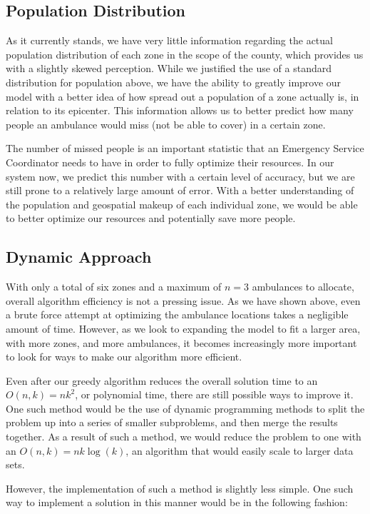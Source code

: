 \documentclass[notitlepage, 12pt]{article}
\begin{document}
\subsection{Population Distribution}
As it currently stands, we have very little information regarding the actual population distribution of each
zone in the scope of the county, which provides us with a slightly skewed perception. While we justified the
use of a standard distribution for population above, we have the ability to greatly improve our model with a
better idea of how spread out a population of a zone actually is, in relation to its epicenter. This information
allows us to better predict how many people an ambulance would miss (not be able to cover) in a certain zone.

The number of missed people is an important statistic that an Emergency Service Coordinator needs to have in
order to fully optimize their resources. In our system now, we predict this number with a certain level of accuracy,
but we are still prone to a relatively large amount of error. With a better understanding of the population and
geospatial makeup of each individual zone, we would be able to better optimize our resources and potentially save more people.

\subsection{Dynamic Approach}
With only a total of six zones and a maximum of $n = 3$ ambulances to allocate, overall algorithm efficiency is
not a pressing issue. As we have shown above, even a brute force attempt at optimizing the ambulance locations
takes a negligible amount of time. However, as we look to expanding the model to fit a larger area, with more
zones, and more ambulances, it becomes increasingly more important to look for ways to make our algorithm more efficient.

Even after our greedy algorithm reduces the overall solution time to an $O(n, k) = nk^2$, or polynomial time, there
are still possible ways to improve it. One such method would be the use of dynamic programming methods to split the
problem up into a series of smaller subproblems, and then merge the results together. As a result of such a method,
we would reduce the problem to one with an $O(n, k) = nk\log(k)$, an algorithm that would easily scale to larger data sets.

However, the implementation of such a method is slightly less simple.
One such way to implement a solution in this manner would be in the following fashion:
\end{document}
